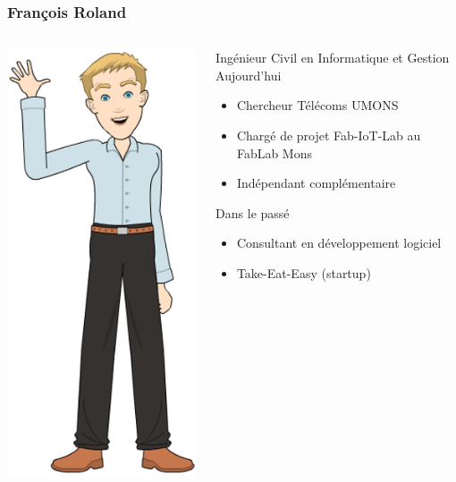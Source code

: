 \documentclass[aspectratio=169,utf8]{beamer}
\begin{document}
\begin{frame}
  \frametitle{François Roland}
  \begin{columns}
    \begin{column}{.3\textwidth}
      \begin{center}
        \includegraphics[height=.7\textheight]{francois1.png}
      \end{center}
    \end{column}
    \begin{column}{.7\textwidth}
      Ingénieur Civil en Informatique et Gestion \\
      Aujourd'hui \\
      \begin{itemize}
        \item Chercheur Télécoms UMONS
        \item Chargé de projet Fab-IoT-Lab au FabLab Mons
        \item Indépendant complémentaire
      \end{itemize}
      Dans le passé \\
      \begin{itemize}
        \item Consultant en développement logiciel
        \item Take-Eat-Easy (startup)
      \end{itemize}
    \end{column}
  \end{columns}
\end{frame}
\end{document}
